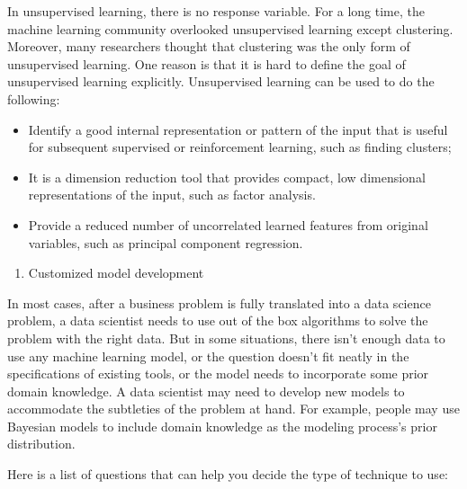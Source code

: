 \documentclass[
  12pt,
]{krantz}
\providecommand{\tightlist}{%
  \setlength{\itemsep}{0pt}\setlength{\parskip}{0pt}}
\begin{document}
In unsupervised learning, there is no response variable. For a long time, the machine learning community overlooked unsupervised learning except clustering. Moreover, many researchers thought that clustering was the only form of unsupervised learning. One reason is that it is hard to define the goal of unsupervised learning explicitly. Unsupervised learning can be used to do the following:

\begin{itemize}
\item
  Identify a good internal representation or pattern of the input that is useful for subsequent supervised or reinforcement learning, such as finding clusters;
\item
  It is a dimension reduction tool that provides compact, low dimensional representations of the input, such as factor analysis.
\item
  Provide a reduced number of uncorrelated learned features from original variables, such as principal component regression.
\end{itemize}

\begin{enumerate}
\def\labelenumi{(\arabic{enumi})}
\setcounter{enumi}{2}
\tightlist
\item
  Customized model development
\end{enumerate}

In most cases, after a business problem is fully translated into a data science problem, a data scientist needs to use out of the box algorithms to solve the problem with the right data. But in some situations, there isn't enough data to use any machine learning model, or the question doesn't fit neatly in the specifications of existing tools, or the model needs to incorporate some prior domain knowledge. A data scientist may need to develop new models to accommodate the subtleties of the problem at hand. For example, people may use Bayesian models to include domain knowledge as the modeling process's prior distribution.

Here is a list of questions that can help you decide the type of technique to use:
\end{document}
